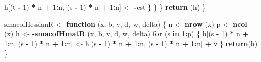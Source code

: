 \documentclass[12pt,]{article}
\newenvironment{Shaded}{\begin{snugshade}}{\end{snugshade}}
\newcommand{\KeywordTok}[1]{\textcolor[rgb]{0.13,0.29,0.53}{\textbf{#1}}}
\newcommand{\DecValTok}[1]{\textcolor[rgb]{0.00,0.00,0.81}{#1}}
\newcommand{\StringTok}[1]{\textcolor[rgb]{0.31,0.60,0.02}{#1}}
\newcommand{\ControlFlowTok}[1]{\textcolor[rgb]{0.13,0.29,0.53}{\textbf{#1}}}
\newcommand{\OperatorTok}[1]{\textcolor[rgb]{0.81,0.36,0.00}{\textbf{#1}}}
\newcommand{\NormalTok}[1]{#1}
\begin{document}
\begin{Shaded}
\begin{Highlighting}[]
{{\NormalTok{        h[(t }\OperatorTok{-}\StringTok{ }\DecValTok{1}\NormalTok{) }\OperatorTok{*}\StringTok{ }\NormalTok{n }\OperatorTok{+}\StringTok{ }\DecValTok{1}\OperatorTok{:}\NormalTok{n, (s }\OperatorTok{-}\StringTok{ }\DecValTok{1}\NormalTok{) }\OperatorTok{*}\StringTok{ }\NormalTok{n }\OperatorTok{+}\StringTok{ }\DecValTok{1}\OperatorTok{:}\NormalTok{n] <-}\StringTok{ }\OperatorTok{-}\NormalTok{cst}
\NormalTok{      \}}
\NormalTok{    \}}
\NormalTok{  \}}
  \KeywordTok{return}\NormalTok{ (h)}
\NormalTok{\}}

\NormalTok{smacofHessianR <-}\StringTok{ }\ControlFlowTok{function}\NormalTok{ (x, b, v, d, w, delta) \{}
\NormalTok{  n <-}\StringTok{ }\KeywordTok{nrow}\NormalTok{ (x)}
\NormalTok{  p <-}\StringTok{ }\KeywordTok{ncol}\NormalTok{ (x)}
\NormalTok{  h <-}\StringTok{ }\OperatorTok{-}\KeywordTok{smacofHmatR}\NormalTok{ (x, b, v, d, w, delta)}
  \ControlFlowTok{for}\NormalTok{ (s }\ControlFlowTok{in} \DecValTok{1}\OperatorTok{:}\NormalTok{p) \{}
\NormalTok{    h[(s }\OperatorTok{-}\StringTok{ }\DecValTok{1}\NormalTok{) }\OperatorTok{*}\StringTok{ }\NormalTok{n }\OperatorTok{+}\StringTok{ }\DecValTok{1}\OperatorTok{:}\NormalTok{n, (s }\OperatorTok{-}\StringTok{ }\DecValTok{1}\NormalTok{) }\OperatorTok{*}\StringTok{ }\NormalTok{n }\OperatorTok{+}\StringTok{ }\DecValTok{1}\OperatorTok{:}\NormalTok{n] <-}
\StringTok{      }\NormalTok{h[(s }\OperatorTok{-}\StringTok{ }\DecValTok{1}\NormalTok{) }\OperatorTok{*}\StringTok{ }\NormalTok{n }\OperatorTok{+}\StringTok{ }\DecValTok{1}\OperatorTok{:}\NormalTok{n, (s }\OperatorTok{-}\StringTok{ }\DecValTok{1}\NormalTok{) }\OperatorTok{*}\StringTok{ }\NormalTok{n }\OperatorTok{+}\StringTok{ }\DecValTok{1}\OperatorTok{:}\NormalTok{n] }\OperatorTok{+}\StringTok{ }\NormalTok{v}
\NormalTok{  \}}
  \KeywordTok{return}\NormalTok{(h)}
\NormalTok{\}}

}}
\end{Highlighting}
\end{Shaded}
\end{document}
